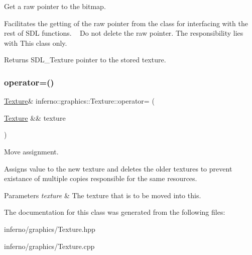 Get a raw pointer to the bitmap. 

Facilitates the getting of the raw pointer from the class for interfacing with the rest of S\+DL functions. ~\newline
Do not delete the raw pointer. The responsibility lies with This class only. \begin{DoxyReturn}{Returns}
S\+D\+L\+\_\+\+Texture pointer to the stored texture. 
\end{DoxyReturn}
\mbox{\label{classinferno_1_1graphics_1_1_texture_a5409fce4e118c09b6caa012ced780a59}} 
\subsubsection{\texorpdfstring{operator=()}{operator=()}}
{\footnotesize\ttfamily \mbox{\hyperlink{classinferno_1_1graphics_1_1_texture}{Texture}}\& inferno\+::graphics\+::\+Texture\+::operator= (\begin{DoxyParamCaption}\item[{\mbox{\hyperlink{classinferno_1_1graphics_1_1_texture}{Texture}} \&\&}]{texture }\end{DoxyParamCaption})\hspace{0.3cm}{\ttfamily [inline]}}



Move assignment. 

Assigns value to the new texture and deletes the older textures to prevent existance of multiple copies responsible for the same resources. 
\begin{DoxyParams}{Parameters}
{\em texture} & The texture that is to be moved into this. \\
\hline
\end{DoxyParams}


The documentation for this class was generated from the following files\+:\begin{DoxyCompactItemize}
\item 
inferno/graphics/Texture.\+hpp\item 
inferno/graphics/Texture.\+cpp\end{DoxyCompactItemize}
